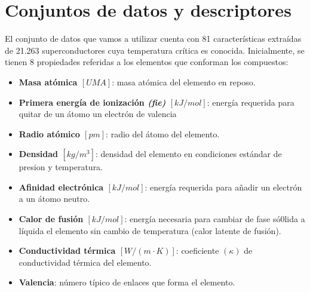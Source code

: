 \documentclass[titlepage, 11pt]{book}
\begin{document}
\section{Conjuntos de datos y descriptores}
El conjunto de datos que vamos a utilizar cuenta con 81 características extraídas de 21.263 superconductores cuya temperatura crítica es conocida. Inicialmente, se tienen 8 propiedades referidas a los elementos que conforman los compuestos:

\begin{itemize}
\item \textbf{Masa atómica $[UMA]$}: masa atómica del elemento en reposo.
\item \textbf{Primera energía de ionización \textit{(fie)} $[kJ/mol]$}: energía requerida para quitar de un átomo un electrón de valencia
\item \textbf{Radio atómico $[pm]$}: radio del átomo del elemento.
\item \textbf{Densidad $[kg/m^3]$}: densidad del elemento en condiciones estándar de presion y temperatura.
\item \textbf{Afinidad electrónica $[kJ/mol]$}: energía requerida para añadir un electrón a un átomo neutro.
\item \textbf{Calor de fusión $[kJ/mol]$}: energía necesaria para cambiar de fase só0lida a líquida el elemento sin cambio de temperatura (calor latente de fusión).
\item \textbf{Conductividad térmica $[W/(m \cdot K)]$}: coeficiente $(\kappa)$ de conductividad térmica del elemento.
\item \textbf{Valencia}: número típico de enlaces que forma el elemento.
\end{itemize}
\end{document}
